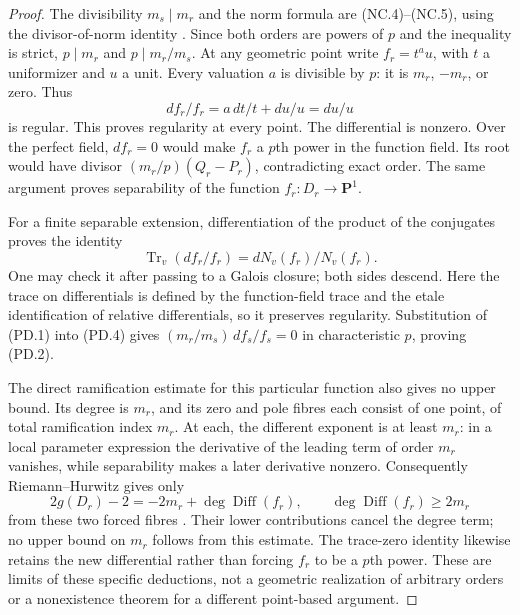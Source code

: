 \begin{proof}
The divisibility $m_s\mid m_r$ and the norm formula are (NC.4)--(NC.5),
using the divisor-of-norm identity
\cite[Lemma~42.18.1, Tag~\texttt{02RT}]{Stacks02RT}.
Since both orders are powers of $p$ and the inequality is strict,
$p\mid m_r$ and $p\mid m_r/m_s$.
At any geometric point write $f_r=t^a u$, with $t$ a uniformizer
and $u$ a unit. Every valuation $a$ is divisible by $p$:
it is $m_r$, $-m_r$, or zero. Thus
\[
                  df_r/f_r=a\,dt/t+du/u=du/u
\tag{PD.3}
\]
is regular. This proves regularity at every point.
The differential is nonzero. Over the perfect field, $df_r=0$
would make $f_r$ a $p$th power in the function field. Its root
would have divisor $(m_r/p)(Q_r-P_r)$, contradicting exact
order. The same argument proves separability of the function
$f_r:D_r\to\mathbf P^1$.

For a finite separable extension, differentiation of the product
of the conjugates proves the identity
\[
       \operatorname{Tr}_v(df_r/f_r)
                    =dN_v(f_r)/N_v(f_r).
\tag{PD.4}
\]
One may check it after passing to a Galois closure; both sides
descend. Here the trace on differentials is defined by the
function-field trace and the etale identification of relative
differentials, so it preserves regularity. Substitution of
(PD.1) into (PD.4) gives
$(m_r/m_s)\,df_s/f_s=0$ in characteristic $p$, proving (PD.2).

The direct ramification estimate for this particular function
also gives no upper bound. Its degree is $m_r$, and its zero
and pole fibres each consist of one point, of total ramification
index $m_r$. At each, the different exponent is at least $m_r$:
in a local parameter expression the derivative of the leading
term of order $m_r$ vanishes, while separability makes a later
derivative nonzero. Consequently Riemann--Hurwitz gives only
\[
 2g(D_r)-2=-2m_r+\deg\operatorname{Diff}(f_r),
              \qquad \deg\operatorname{Diff}(f_r)\ge2m_r
\tag{PD.5}
\]
from these two forced fibres
\cite[Lemma~53.12.4, Tag~\texttt{0C1F}]{StacksRH}.
Their lower contributions cancel the degree term; no upper
bound on $m_r$ follows from this estimate. The trace-zero
identity likewise retains the new differential rather than
forcing $f_r$ to be a $p$th power. These are limits of these
specific deductions, not a geometric realization of arbitrary
orders or a nonexistence theorem for a different point-based
argument.
\end{proof}
